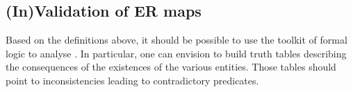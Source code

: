 \subsection{(In)Validation of ER maps}

Based on the definitions above, it should be possible to use the toolkit of formal logic to analyse \ERs{}. In particular, one can envision to build truth tables describing the consequences of the existences of the various entities. Those tables should point to inconsistencies leading to contradictory predicates.



